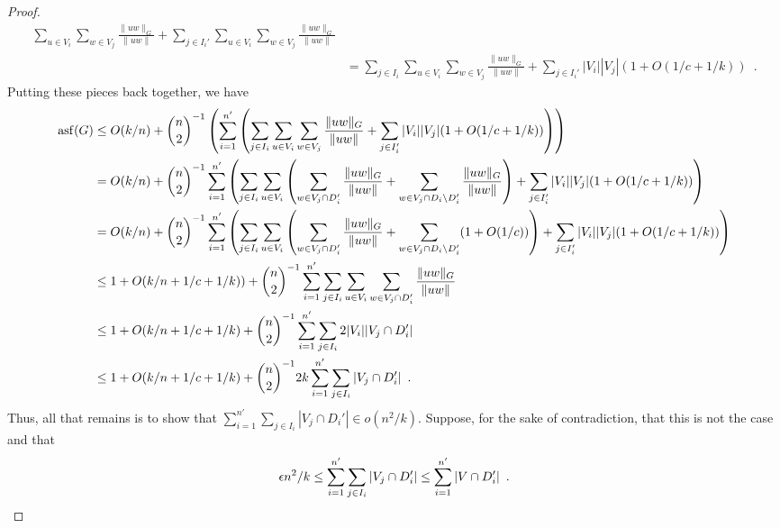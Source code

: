 \documentclass{patmorin}
\DeclareMathOperator{\asf}{asf}
\begin{document}
\begin{proof}
\begin{align*}
           \sum_{u\in V_i}\sum_{w\in V_j}\frac{\|uw\|_G}{\|uw\|}
         + \sum_{j\in I_i'}
           \sum_{u\in V_i}\sum_{w\in V_j}\frac{\|uw\|_G}{\|uw\|} \\
      & = \sum_{j\in I_i}
          \sum_{u\in V_i}\sum_{w\in V_j}\frac{\|uw\|_G}{\|uw\|} 
         + \sum_{j\in I_i'} |V_i||V_j|(1+O(1/c+1/k)) \enspace .
  \end{align*}
  Putting these pieces back together, we have
  \begin{align}
     \asf(G) & \le O(k/n) + \binom{n}{2}^{-1}\left(
       \sum_{i=1}^{n'}\left(\sum_{j\in I_i}
          \sum_{u\in V_i}\sum_{w\in V_j}\frac{\|uw\|_G}{\|uw\|} 
         + \sum_{j\in I_i'} |V_i||V_j|(1+O(1/c+1/k))\right)\right) \notag\\
      & = O(k/n) +\binom{n}{2}^{-1}
       \sum_{i=1}^{n'}\left(\sum_{j\in I_i}
          \sum_{u\in V_i}\left(
             \sum_{w\in V_j\cap D_i'}
               \frac{\|uw\|_G}{\|uw\|}
             +\sum_{w\in V_j\cap D_i\setminus D_i'}
               \frac{\|uw\|_G}{\|uw\|}
           \right)
          + \sum_{j\in I_i'} |V_i||V_j|(1+O(1/c+1/k)) \right) \notag\\
      & = O(k/n) +\binom{n}{2}^{-1}
       \sum_{i=1}^{n'}\left(\sum_{j\in I_i}
          \sum_{u\in V_i}\left(
             \sum_{w\in V_j\cap D_i'}
               \frac{\|uw\|_G}{\|uw\|}
             +\sum_{w\in V_j\cap D_i\setminus D_i'}
               (1+O(1/c))
           \right)
          + \sum_{j\in I_i'} |V_i||V_j|(1+O(1/c+1/k)) \right) \notag\\
     & \le 1+O(k/n+1/c+1/k)) +\binom{n}{2}^{-1}
       \sum_{i=1}^{n'}\sum_{j\in I_i}
          \sum_{u\in V_i}
             \sum_{w\in V_j\cap D_i'}
               \frac{\|uw\|_G}{\|uw\|} \notag\\
     & \le 1+O(k/n+1/c+1/k) +\binom{n}{2}^{-1}
       \sum_{i=1}^{n'}\sum_{j\in I_i} 2 |V_i||V_j\cap D_i'| \notag\\
     & \le 1+O(k/n+1/c+1/k) +\binom{n}{2}^{-1}
       2k\sum_{i=1}^{n'}\sum_{j\in I_i} |V_j\cap D_i'| \eqlabel{huff} 
     \enspace .
  \end{align}
  Thus, all that remains is to show that
  $\sum_{i=1}^{n'}\sum_{j\in I_i} |V_j\cap D_i'| \in o(n^2/k)$.
  Suppose, for the sake of contradiction, that this is not the case
  and that
  \begin{equation}
      \epsilon n^2/k \le  \sum_{i=1}^{n'}\sum_{j\in I_i} |V_j\cap D_i'| 
         \le \sum_{i=1}^{n'} |V\cap D_i'| \enspace . \eqlabel{kicker}
  \end{equation}

\end{proof}
\end{document}
